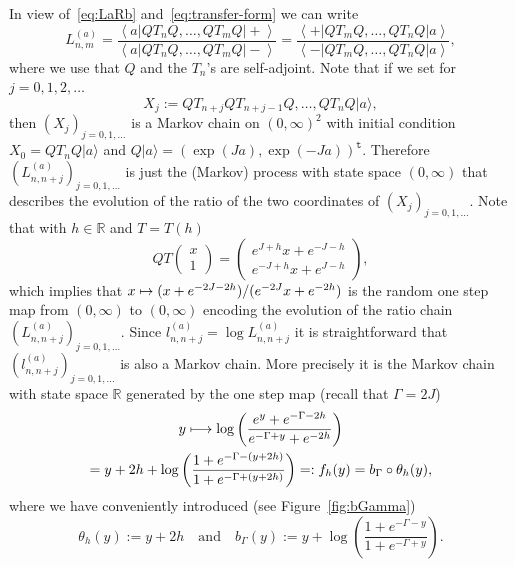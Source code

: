 \documentclass[AHL,Unicode,longabstracts,published]{cedram}
\newcommand{\bbR}{\mathbb{R}}
\newcommand{\gG}{\Gamma}
\newcommand{\ttt}{\mathtt{t}}
\newcommand{\tsp}{\ttt}
\let\oldmapsto\mapsto
\renewcommand*{\mapsto}{\mathchoice{\longmapsto}{\oldmapsto}{\oldmapsto}{\oldmapsto}}
\begin{document}
In view of~\eqref{eq:LaRb} and~\eqref{eq:transfer-form} we can write
\begin{equation}\label{eq:LaRb-2.1}
L_{n,m}^{(a)}= \frac {\left\langle a \left| Q T_n Q,\dots, Q T_{m} Q \right | + \right \rangle} {\left\langle a \left| Q T_n Q,\dots, Q T_{m} Q \right | - \right \rangle}
= \frac {\left\langle + \left| Q T_m Q,\dots, Q T_{n} Q \right| a \right\rangle} {\left\langle - \left| Q T_m Q,\dots, Q T_{n} Q \right| a \right\rangle},
\end{equation}
where we use that $Q$ and the $T_n$'s are self-adjoint. Note that if we set for $j=0, 1,2, \dots$
\begin{equation}
X_j:= Q T_{n+j} Q T_{n+j-1} Q,\dots, Q T_{n} Q | a\rangle,
\end{equation}
then $(X_j)_{j=0,1, \dots}$ is a Markov chain on $(0, \infty)^2$ { with initial condition $X_0 = Q T_n Q | a\rangle$ and $Q | a\rangle= (\exp(Ja),\exp(-Ja))^{\tsp}$.} Therefore $(L_{n, n+j}^{(a)})_{j=0,1,\dots}$ is just the (Markov) process with state space $(0, \infty)$ that describes the evolution of the ratio of the two coordinates of $(X_j)_{j=0,1, \dots}$. Note that with $h\in\bbR$ and $T=T(h)$
\begin{equation}\label{eq:1-step.0}
QT
\begin{pmatrix}
x \\ 1
\end{pmatrix}=
\begin{pmatrix}
e^{J+h}x +e^{-J-h}\\
e^{-J+h}x + e^{J-h}
\end{pmatrix},
\end{equation}
which implies that $x \mapsto(x+ e^{-2J-2h})/(e^{-2J} x+ e^{-2h})$ is the random one step map from $(0, \infty)$ to $(0, \infty)$ encoding the evolution of the ratio chain $(L_{n, n+j}^{(a)})_{j=0,1, \dots}$. Since $l_{n, n+j}^{(a)}= \log L_{n, n+j}^{(a)}$ it is straightforward that $(l_{n, n+j}^{(a)})_{j=0,1, \dots}$ is also a Markov chain. More precisely it is the Markov chain with state space $\bbR$ generated by the one step map (recall that $\gG= 2J$)
\begin{multline}\label{eq:f_h}
y \mapsto \log \left(\frac{e^y+e^{-\gG -2h}}{e^{-\gG +y} + e^{-2h}} \right)\\
= y+ 2h+ \log \left(\frac{1+e^{-\gG-(y+2h)}}{1+e^{-\gG +(y+2h)}} \right) =:
 f_h(y) = b_\gG \circ \theta_h (y),
\end{multline}
where we have conveniently introduced (see Figure~\ref{fig:bGamma})
\begin{equation}
\theta_h(y):= y+2h\quad\text{and}\quad b_\gG(y):= y+ \log \left(\frac{1+e^{-\gG-y}}{1+e^{-\gG +y}} \right).
\end{equation}
\end{document}
